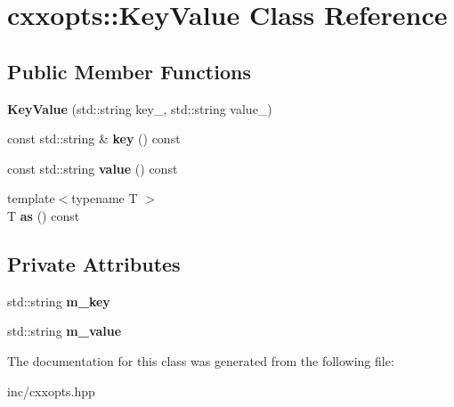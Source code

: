 \hypertarget{classcxxopts_1_1KeyValue}{}\section{cxxopts\+:\+:Key\+Value Class Reference}
\label{classcxxopts_1_1KeyValue}
\subsection*{Public Member Functions}
\begin{DoxyCompactItemize}
\item 
{\bfseries Key\+Value} (std\+::string key\+\_\+, std\+::string value\+\_\+)\hypertarget{classcxxopts_1_1KeyValue_aa517bd30c2c0071cc76f6e7244da5f2f}{}\label{classcxxopts_1_1KeyValue_aa517bd30c2c0071cc76f6e7244da5f2f}

\item 
const std\+::string \& {\bfseries key} () const \hypertarget{classcxxopts_1_1KeyValue_a09a8e9259730aef03642bfbdd54d49d3}{}\label{classcxxopts_1_1KeyValue_a09a8e9259730aef03642bfbdd54d49d3}

\item 
const std\+::string {\bfseries value} () const \hypertarget{classcxxopts_1_1KeyValue_ada34d695c20b22f97ce9f8e076e36482}{}\label{classcxxopts_1_1KeyValue_ada34d695c20b22f97ce9f8e076e36482}

\item 
{\footnotesize template$<$typename T $>$ }\\T {\bfseries as} () const \hypertarget{classcxxopts_1_1KeyValue_aa80e6a51d7711f4ae8191cbc780a3def}{}\label{classcxxopts_1_1KeyValue_aa80e6a51d7711f4ae8191cbc780a3def}

\end{DoxyCompactItemize}
\subsection*{Private Attributes}
\begin{DoxyCompactItemize}
\item 
std\+::string {\bfseries m\+\_\+key}\hypertarget{classcxxopts_1_1KeyValue_a178a9b3f09d6cd186ada7254b8650401}{}\label{classcxxopts_1_1KeyValue_a178a9b3f09d6cd186ada7254b8650401}

\item 
std\+::string {\bfseries m\+\_\+value}\hypertarget{classcxxopts_1_1KeyValue_adca1ff7f66e9f29f7a59e8c2c8a7b4d3}{}\label{classcxxopts_1_1KeyValue_adca1ff7f66e9f29f7a59e8c2c8a7b4d3}

\end{DoxyCompactItemize}


The documentation for this class was generated from the following file\+:\begin{DoxyCompactItemize}
\item 
inc/cxxopts.\+hpp\end{DoxyCompactItemize}
